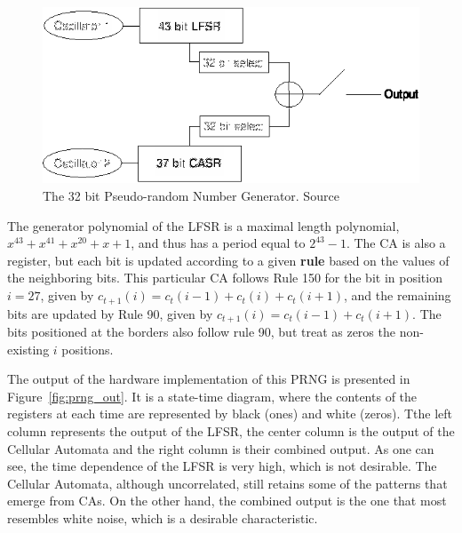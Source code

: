 \begin{figure}
    \centering
    \includegraphics[width=\linewidth]{figures/prng.eps}
    \caption[The 32 bit Pseudo-random Number Generator. Source~\cite{Tkacik2003}]{The 32 bit Pseudo-random Number Generator. Source~\cite{Tkacik2003}}
    \label{fig:prng}
\end{figure}
The generator polynomial of the LFSR is a maximal length polynomial, $x^{43}+x^{41}+x^{20}+x+1$, and thus has a period equal to $2^{43}-1$. The CA is also a register, but each bit is updated
according to a given \textbf{rule} based on the values of the neighboring bits. This particular CA follows Rule 150 for the bit in position $i=27$, given by $c_{t+1}(i) = c_{t}(i-1) + c_{t}(i) + c_{t}(i+1)$, and
the remaining bits are updated by Rule 90, given by $c_{t+1}(i) = c_{t}(i-1) + c_{t}(i+1)$. The bits positioned at the borders also follow rule 90, but treat as zeros the non-existing $i$ positions.

The output of the hardware implementation of this PRNG is presented in Figure~\ref{fig:prng_out}. It is a state-time diagram, where the contents of the
registers at each time are represented by black (ones) and white (zeros). Tthe left column represents the output of the LFSR, the center column is the
output of the Cellular Automata and the right column is their combined output. As one can see, the time dependence of the LFSR is very high, which is not desirable.
The Cellular Automata, although uncorrelated, still retains some of the patterns that emerge from CAs. On the other hand, the combined output is the one that most resembles
white noise, which is a desirable characteristic.

